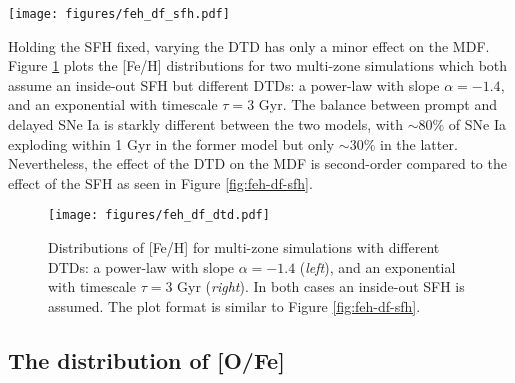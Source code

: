 \documentclass[twocolumn,linenumbers,twocolappendix]{aastex631}
\begin{document}
\begin{figure*}
    \centering
    \texttt{[image: figures/feh\_df\_sfh.pdf]}
    \caption{Distributions of [Fe/H] for multi-zone simulations with different SFHs. Each row presents distributions of stars within a range of absolute midplane distance: $1\leq|z|<2$ kpc (\textit{top}), $0.5\leq|z|<1$ kpc (\textit{middle}), and $0\leq|z|<0.5$ kpc (\textit{bottom}). Within each panel, curves of different color represent the distributions of stars binned by Galactocentric radius $R_{\rm gal}$, from $3\leq R_{\rm gal}<5$ kpc (yellow) to $13\leq R_{\rm gal}<15$ kpc (blue). Each distribution is normalized so the area under the curve is 1, and the vertical scale is consistent across each row. All distributions are convolved with observational uncertainties in APOGEE DR17 (see Table \ref{tab:uncertainties}) and smoothed with a box-car width of 0.2 dex. In all cases an exponential DTD with timescale $\tau=1.5$ Gyr is assumed. Distributions from APOGEE DR17, binned similarly, are presented in the right-most column for reference.}
    \label{fig:feh-df-sfh}
\end{figure*}

Holding the SFH fixed, varying the DTD has only a minor effect on the MDF. Figure \ref{fig:feh-df-dtd} plots the [Fe/H] distributions for two multi-zone simulations which both assume an inside-out SFH but different DTDs: a power-law with slope $\alpha=-1.4$, and an exponential with timescale $\tau=3$ Gyr. The balance between prompt and delayed SNe Ia is starkly different between the two models, with $\sim 80\%$ of SNe Ia exploding within 1 Gyr in the former model but only $\sim 30\%$ in the latter. Nevertheless, the effect of the DTD on the MDF is second-order compared to the effect of the SFH as seen in Figure \ref{fig:feh-df-sfh}.

\begin{figure}
    \centering
    \texttt{[image: figures/feh\_df\_dtd.pdf]}
    \caption{Distributions of [Fe/H] for multi-zone simulations with different DTDs: a power-law with slope $\alpha=-1.4$ (\textit{left}), and an exponential with timescale $\tau=3$ Gyr (\textit{right}). In both cases an inside-out SFH is assumed. The plot format is similar to Figure \ref{fig:feh-df-sfh}.}
    \label{fig:feh-df-dtd}
\end{figure}

\subsection{The distribution of [O/Fe]}
\end{document}
